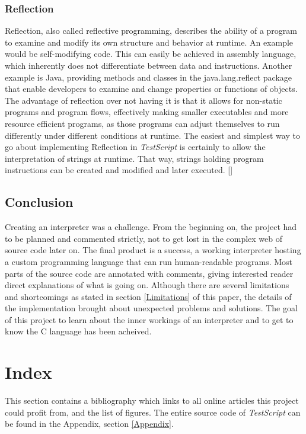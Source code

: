 \documentclass[12pt,a4paper]{article}
\newcommand{\name}{\emph{TestScript}}
\begin{document}
\subsubsection{Reflection}
Reflection, also called reflective programming, describes
the ability of a program to examine and modify its own structure and behavior 
at runtime. An example would be self-modifying code. This can easily be
achieved in assembly language, which inherently does not differentiate between
data and instructions.
Another example is Java, providing methods and classes in the java.lang.reflect
package that enable developers to examine and change properties or functions
of objects.
The advantage of reflection over not having it is that it allows for non-static
programs and program flows, effectively making smaller executables and more
resource efficient programs, as those programs can adjust themselves to run
differently under different conditions at runtime.
The easiest and simplest way to go about implementing Reflection in \name{} is
certainly to allow the interpretation of strings at runtime. That way, strings
holding program instructions can be created and modified and later executed.
[]

\subsection{Conclusion}
Creating an interpreter was a challenge. From the beginning on, the project
had to be planned and commented strictly, not to get lost in the complex web
of source code later on. The final product is a success, a working interpreter
hosting a custom programming language that can run human-readable programs.
Most parts of the source code are annotated with comments, giving interested
reader direct explanations of what is going on.
Although there are several limitations and shortcomings as stated in section \ref{Limitations}
of this paper, the details of the implementation brought about unexpected 
problems and solutions. The goal of this project to learn about 
the inner workings of an interpreter and
to get to know the C language has been acheived.


\section{Index}
This section contains a bibliography which links to all online articles
this project could profit from, and the list of figures.
The entire source code of \name{} can be found in the Appendix, section \ref{Appendix}.
\end{document}
